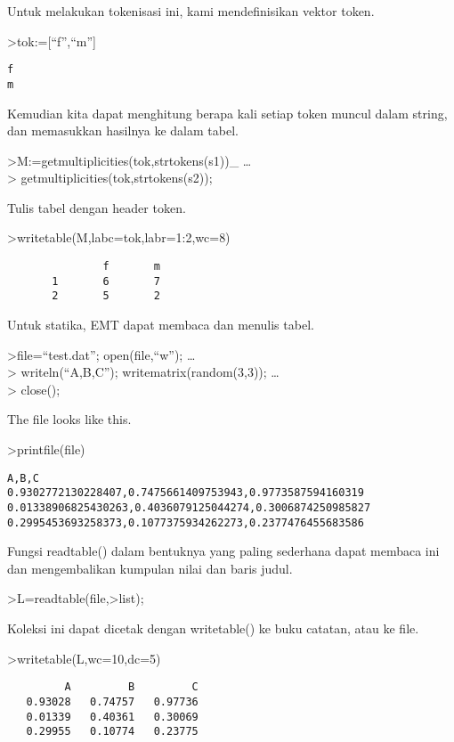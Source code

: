 \documentclass[
]{book}
\begin{document}
Untuk melakukan tokenisasi ini, kami mendefinisikan vektor token.

\textgreater tok:={[}``f'',``m''{]}

\begin{verbatim}
f
m
\end{verbatim}

Kemudian kita dapat menghitung berapa kali setiap token muncul dalam string, dan memasukkan hasilnya ke dalam tabel.

\textgreater M:=getmultiplicities(tok,strtokens(s1))\_ \ldots{}\\
\textgreater{} getmultiplicities(tok,strtokens(s2));

Tulis tabel dengan header token.

\textgreater writetable(M,labc=tok,labr=1:2,wc=8)

\begin{verbatim}
               f       m
       1       6       7
       2       5       2
\end{verbatim}

Untuk statika, EMT dapat membaca dan menulis tabel.

\textgreater file=``test.dat''; open(file,``w''); \ldots{}\\
\textgreater{} writeln(``A,B,C''); writematrix(random(3,3)); \ldots{}\\
\textgreater{} close();

The file looks like this.

\textgreater printfile(file)

\begin{verbatim}
A,B,C
0.9302772130228407,0.7475661409753943,0.9773587594160319
0.01338906825430263,0.4036079125044274,0.3006874250985827
0.2995453693258373,0.1077375934262273,0.2377476455683586
\end{verbatim}

Fungsi readtable() dalam bentuknya yang paling sederhana dapat membaca ini dan mengembalikan kumpulan nilai dan baris judul.

\textgreater L=readtable(file,\textgreater list);

Koleksi ini dapat dicetak dengan writetable() ke buku catatan, atau ke file.

\textgreater writetable(L,wc=10,dc=5)

\begin{verbatim}
         A         B         C
   0.93028   0.74757   0.97736
   0.01339   0.40361   0.30069
   0.29955   0.10774   0.23775
\end{verbatim}
\end{document}

